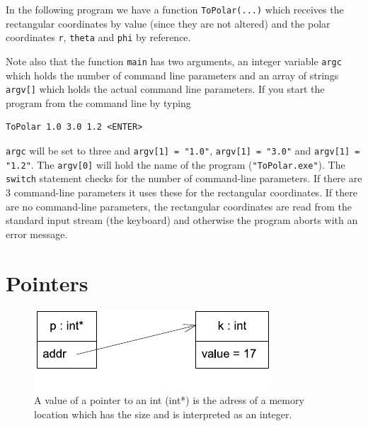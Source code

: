 In the following program we have a function \verb+ToPolar(...)+ which receives the
rectangular coordinates by value (since they are not altered) and the polar coordinates
\verb+r+, \verb+theta+ and \verb+phi+ by reference.

\noindent{\small}

Note also that the function \verb+main+ has two arguments, an integer variable
\verb+argc+ which holds the number of command line parameters and
an array of strings \verb+argv[]+ which holds the actual command line parameters.
 
If you start the program from the command line by typing
{\small \begin{verbatim}
ToPolar 1.0 3.0 1.2 <ENTER>
\end{verbatim}}
\noindent
\verb+argc+ will be set to three and \verb+argv[1] = "1.0"+,  \verb+argv[1] = "3.0"+
and \verb+argv[1] = "1.2"+. The \verb+argv[0]+ will hold the name of the program
(\verb+"ToPolar.exe"+). The \verb+switch+ 
statement checks
for the number of command-line parameters. If there are 3 command-line parameters
 it uses these for the rectangular coordinates. If there
are no command-line parameters, the rectangular coordinates are read from the standard
input stream (the keyboard) and otherwise the program aborts with an error message.


\section{Pointers}


  \begin{figure}[htb]
    \begin{center}  
      \includegraphics{BasicCPP/Figures/Pointer.pdf}
    \end{center}  
    \caption{A value of a pointer to an int (int*) is the adress of a memory location which
              has the size and is interpreted as an integer.
             \label{figPointer}} 
  \end{figure}

